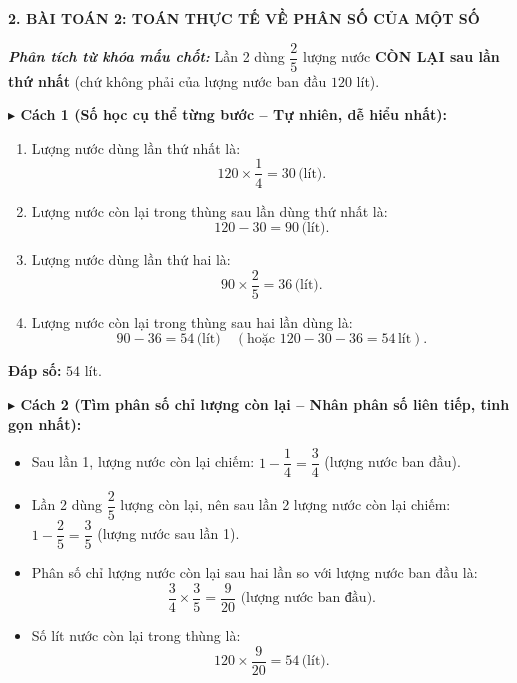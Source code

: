 \documentclass[12pt,a4paper]{article}
\begin{document}
\newpage

\noindent\textbf{\large 2. BÀI TOÁN 2: TOÁN THỰC TẾ VỀ PHÂN SỐ CỦA MỘT SỐ}

\vspace{1mm}
\noindent\textbf{\textit{Phân tích từ khóa mấu chốt:}} Lần 2 dùng $\dfrac{2}{5}$ lượng nước \textbf{CÒN LẠI sau lần thứ nhất} (chứ không phải của lượng nước ban đầu $120$ lít).

\vspace{2mm}
\noindent\textbf{$\blacktriangleright$ Cách 1 (Số học cụ thể từng bước -- Tự nhiên, dễ hiểu nhất):}
\begin{enumerate}[label=\arabic*), leftmargin=18pt, itemsep=2pt, parsep=0pt]
  \item Lượng nước dùng lần thứ nhất là:
  \[
    120 \times \frac{1}{4} = 30\,\text{(lít)}.
  \]
  \item Lượng nước còn lại trong thùng sau lần dùng thứ nhất là:
  \[
    120 - 30 = 90\,\text{(lít)}.
  \]
  \item Lượng nước dùng lần thứ hai là:
  \[
    90 \times \frac{2}{5} = 36\,\text{(lít)}.
  \]
  \item Lượng nước còn lại trong thùng sau hai lần dùng là:
  \[
    90 - 36 = 54\,\text{(lít)} \quad (\text{hoặc } 120 - 30 - 36 = 54\,\text{lít}).
  \]
\end{enumerate}
\textbf{Đáp số:} $54$ lít.

\vspace{2.5mm}
\noindent\textbf{$\blacktriangleright$ Cách 2 (Tìm phân số chỉ lượng còn lại -- Nhân phân số liên tiếp, tinh gọn nhất):}
\begin{itemize}[leftmargin=16pt, itemsep=2pt, parsep=0pt]
  \item Sau lần 1, lượng nước còn lại chiếm: $1 - \dfrac{1}{4} = \dfrac{3}{4}$ (lượng nước ban đầu).
  \item Lần 2 dùng $\dfrac{2}{5}$ lượng còn lại, nên sau lần 2 lượng nước còn lại chiếm:
  $1 - \dfrac{2}{5} = \dfrac{3}{5}$ (lượng nước sau lần 1).
  \item Phân số chỉ lượng nước còn lại sau hai lần so với lượng nước ban đầu là:
  \[
    \frac{3}{4} \times \frac{3}{5} = \frac{9}{20} \text{ (lượng nước ban đầu)}.
  \]
  \item Số lít nước còn lại trong thùng là:
  \[
    120 \times \frac{9}{20} = 54\,\text{(lít)}.
  \]
\end{itemize}
\end{document}
